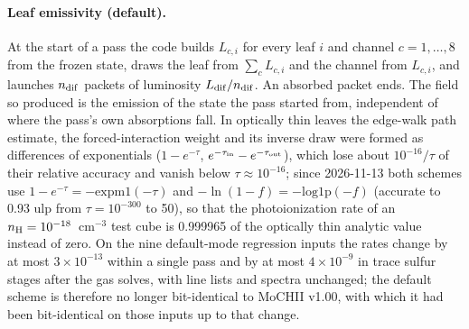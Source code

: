 \documentclass[english,a4paper]{my_memo}
\begin{document}
\paragraph{Leaf emissivity (default).}  At the start of a pass the code
builds $L_{c,i}$ for every leaf $i$ and channel $c=1,\dots,8$ from the frozen
state, draws the leaf from $\sum_c L_{c,i}$ and the channel from $L_{c,i}$, and
launches $n_{\rm dif}$ packets of luminosity $L_{\rm dif}/n_{\rm dif}$.
An absorbed packet ends.  The field so produced is the emission of the state
the pass started from, independent of where the pass's own absorptions fall.
In optically thin leaves the edge-walk path estimate, the forced-interaction
weight and its inverse draw were formed as differences of exponentials
($1-e^{-\tau}$, $e^{-\tau_{\rm in}}-e^{-\tau_{\rm out}}$), which lose about
$10^{-16}/\tau$ of their relative accuracy and vanish below
$\tau\approx10^{-16}$; since 2026-11-13 both schemes use
$1-e^{-\tau}=-\mathrm{expm1}(-\tau)$ and $-\ln(1-f)=-\mathrm{log1p}(-f)$
(accurate to 0.93 ulp from $\tau=10^{-300}$ to 50), so that the
photoionization rate of an $n_{\rm H}=10^{-18}$~cm$^{-3}$ test cube is 0.999965
of the optically thin analytic value instead of zero. On the nine default-mode
regression inputs the rates change by at most $3\times10^{-13}$ within a single
pass and by at most $4\times10^{-9}$ in trace sulfur stages after the gas
solves, with line lists and spectra unchanged; the default scheme is therefore
no longer bit-identical to MoCHII v1.00, with which it had been bit-identical
on those inputs up to that change.
\end{document}
